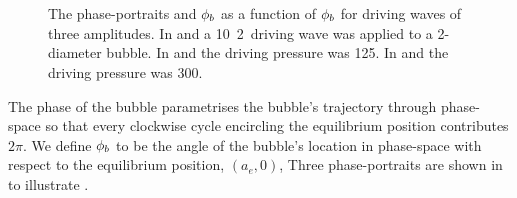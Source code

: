\begin{figure}
  \centering
  \quad
  \\
  \qquad
  \\
  \qquad
   \caption{ 
The phase-portraits and ${\phi_b}$ as a function of ${\phi_b}$ for driving waves of three amplitudes.
In \protect{} and \protect{} a \unit{10}\kilo\pascal\, \unit{2}\mega\hertz\ driving wave
was applied to a \unit{2}\micro\metre-diameter bubble.
In \protect{} and \protect{} the driving pressure was  \unit{125}\kilo\pascal.
In \protect{} and \protect{} the driving pressure was  \unit{300}\kilo\pascal.
%
  }
  \label{fig:Phases}
\end{figure}
The phase of the bubble parametrises the bubble's trajectory through phase-space
so that every clockwise cycle  encircling the equilibrium position contributes $2\pi$.
We define ${\phi_b}$ to be the angle of the bubble's location in phase-space  with respect to the equilibrium position, $(a_e,0)$,
Three phase-portraits are shown in  to illustrate  .


